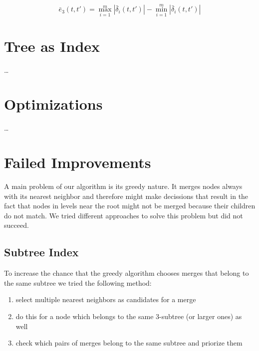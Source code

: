 \begin{equation}\label{eq:e3_up}
    \bar{e}_3\left(t, t'\right) = \max_{i=1}^m \left|\bar{\delta}_i(t, t')\right| - \min_{i=1}^m \left|\bar{\delta}_i(t, t')\right|
\end{equation}



\section{Tree as Index}
\label{sec:algorithm:asindex}

\dots



\section{Optimizations}
\label{sec:algorithm:opt}

\dots



\section{Failed Improvements}
\label{sec:algorithm:fail}

A main problem of our algorithm is its greedy nature. It merges nodes always with its nearest neighbor and therefore might make decissions that result in the fact that nodes in levels near the root might not be merged because their children do not match. We tried different approaches to solve this problem but did not succeed.


\subsection{Subtree Index}
\label{ssec:algorithm:fail:stindex}

To increase the chance that the greedy algorithm chooses merges that belong to the same subtree we tried the following method:

\begin{enumerate}
    \item select multiple nearest neighbors as candidates for a merge
    \item do this for a node which belongs to the same \num{3}-subtree (or larger ones) as well
    \item check which pairs of merges belong to the same subtree and priorize them
\end{enumerate}

